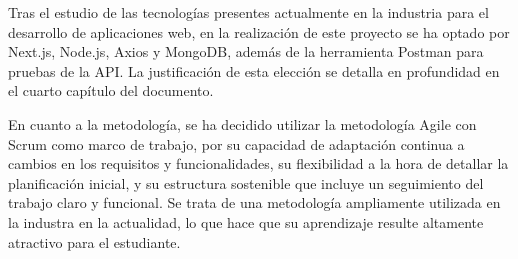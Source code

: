 Tras el estudio de las tecnologías presentes actualmente en la industria para el desarrollo de aplicaciones web, en la realización de este proyecto se ha optado por Next.js, Node.js, Axios y MongoDB, además de la herramienta Postman para pruebas de la API. La justificación de esta elección se detalla en profundidad en el cuarto capítulo del documento.

En cuanto a la metodología, se ha decidido utilizar la metodología Agile con Scrum como marco de trabajo, por su capacidad de adaptación continua a cambios en los requisitos y funcionalidades, su flexibilidad a la hora de detallar la planificación inicial, y su estructura sostenible que incluye un seguimiento del trabajo claro y funcional. Se trata de una metodología ampliamente utilizada en la industra en la actualidad, lo que hace que su aprendizaje resulte altamente atractivo para el estudiante.